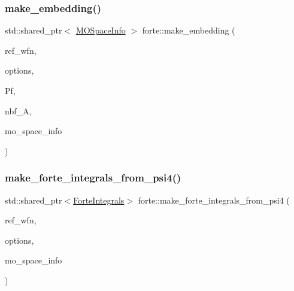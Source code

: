 \mbox{\label{namespaceforte_abcac95a44be04c33b4b69adf43ee06c9}} 
\subsubsection{\texorpdfstring{make\+\_\+embedding()}{make\_embedding()}}
{\footnotesize\ttfamily std\+::shared\+\_\+ptr$<$ \mbox{\hyperlink{classforte_1_1_m_o_space_info}{M\+O\+Space\+Info}} $>$ forte\+::make\+\_\+embedding (\begin{DoxyParamCaption}\item[{psi\+::\+Shared\+Wavefunction}]{ref\+\_\+wfn,  }\item[{std\+::shared\+\_\+ptr$<$ \mbox{\hyperlink{classforte_1_1_forte_options}{Forte\+Options}} $>$}]{options,  }\item[{psi\+::\+Shared\+Matrix}]{Pf,  }\item[{int}]{nbf\+\_\+A,  }\item[{std\+::shared\+\_\+ptr$<$ \mbox{\hyperlink{classforte_1_1_m_o_space_info}{M\+O\+Space\+Info}} $>$}]{mo\+\_\+space\+\_\+info }\end{DoxyParamCaption})}

\mbox{\label{namespaceforte_afd3697ae3b48de7ded46869f6752a194}} 
\subsubsection{\texorpdfstring{make\+\_\+forte\+\_\+integrals\+\_\+from\+\_\+psi4()}{make\_forte\_integrals\_from\_psi4()}\hspace{0.1cm}{\footnotesize\ttfamily [1/2]}}
{\footnotesize\ttfamily std\+::shared\+\_\+ptr$<$\mbox{\hyperlink{classforte_1_1_forte_integrals}{Forte\+Integrals}}$>$ forte\+::make\+\_\+forte\+\_\+integrals\+\_\+from\+\_\+psi4 (\begin{DoxyParamCaption}\item[{std\+::shared\+\_\+ptr$<$ psi\+::\+Wavefunction $>$}]{ref\+\_\+wfn,  }\item[{std\+::shared\+\_\+ptr$<$ \mbox{\hyperlink{classforte_1_1_forte_options}{forte\+::\+Forte\+Options}} $>$}]{options,  }\item[{std\+::shared\+\_\+ptr$<$ \mbox{\hyperlink{classforte_1_1_m_o_space_info}{M\+O\+Space\+Info}} $>$}]{mo\+\_\+space\+\_\+info }\end{DoxyParamCaption})}

